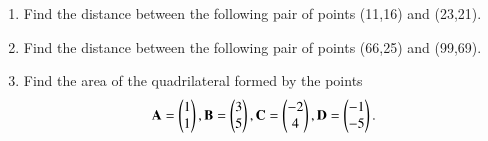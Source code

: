 \renewcommand{\theequation}{\theenumi}
\renewcommand{\thefigure}{\theenumi}
\begin{enumerate}[label=\thesubsection.\arabic*.,ref=\thesubsection.\theenumi]

\item Find the distance between the following pair of points
(11,16) and (23,21).\\


\item Find the distance between the following pair of points
(66,25) and (99,69).
\\

%
\item Find the area of the quadrilateral formed by the points
\begin{align}
\begin{split}
\mathbf{A} = \begin{pmatrix}1 \\ 1\end{pmatrix}, 
\mathbf{B} = \begin{pmatrix}3 \\ 5\end{pmatrix}, 
\mathbf{C} = \begin{pmatrix}-2 \\ 4\end{pmatrix}, 
\mathbf{D} = \begin{pmatrix}-1 \\ -5\end{pmatrix}.
\end{split}
\end{align}
\solution

\end{enumerate}

